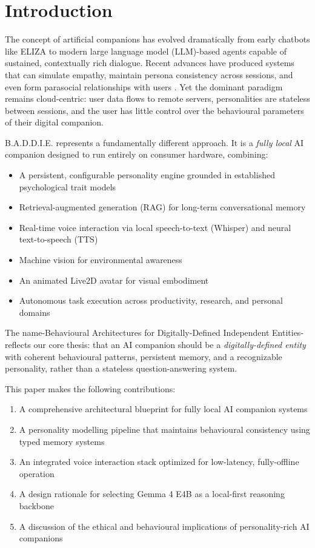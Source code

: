 \documentclass[sigconf]{acmart}
\begin{document}
\section{Introduction}

The concept of artificial companions has evolved dramatically from early chatbots like ELIZA \cite{weizenbaum1966eliza} to modern large language model (LLM)-based agents capable of sustained, contextually rich dialogue. Recent advances have produced systems that can simulate empathy, maintain persona consistency across sessions, and even form parasocial relationships with users \cite{chen2024tmlr-persona, tissaoui2026prompt}. Yet the dominant paradigm remains cloud-centric: user data flows to remote servers, personalities are stateless between sessions, and the user has little control over the behavioural parameters of their digital companion.

B.A.D.D.I.E. represents a fundamentally different approach. It is a \textit{fully local} AI companion designed to run entirely on consumer hardware, combining:

\begin{itemize}
    \item A persistent, configurable personality engine grounded in established psychological trait models
    \item Retrieval-augmented generation (RAG) for long-term conversational memory
    \item Real-time voice interaction via local speech-to-text (Whisper) and neural text-to-speech (TTS)
    \item Machine vision for environmental awareness
    \item An animated Live2D avatar for visual embodiment
    \item Autonomous task execution across productivity, research, and personal domains
\end{itemize}

The name-Behavioural Architectures for Digitally-Defined Independent Entities-reflects our core thesis: that an AI companion should be a \textit{digitally-defined entity} with coherent behavioural patterns, persistent memory, and a recognizable personality, rather than a stateless question-answering system.

This paper makes the following contributions:
\begin{enumerate}
    \item A comprehensive architectural blueprint for fully local AI companion systems
    \item A personality modelling pipeline that maintains behavioural consistency using typed memory systems
    \item An integrated voice interaction stack optimized for low-latency, fully-offline operation
    \item A design rationale for selecting Gemma 4 E4B as a local-first reasoning backbone
    \item A discussion of the ethical and behavioural implications of personality-rich AI companions
\end{enumerate}
\end{document}
